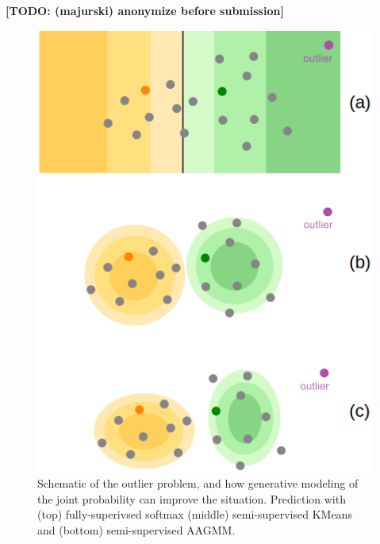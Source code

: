 \documentclass[10pt,twocolumn,letterpaper]{article}
\newcommand{\TODO}[1]{\textbf{\color{red}[TODO: #1]}}
\begin{document}
\TODO{(majurski) anonymize before submission}

\begin{figure}[ht]
	\centering
	
	\includegraphics[width=0.75\linewidth]{figures/illustration.png}
	\caption{Schematic of the outlier problem, and how generative modeling of the joint probability can improve the situation.  Prediction with (top) fully-superivsed softmax (middle) semi-supervised KMeans and (bottom) semi-supervised AAGMM.} 
	\label{fig:schema}
\end{figure}
\end{document}
